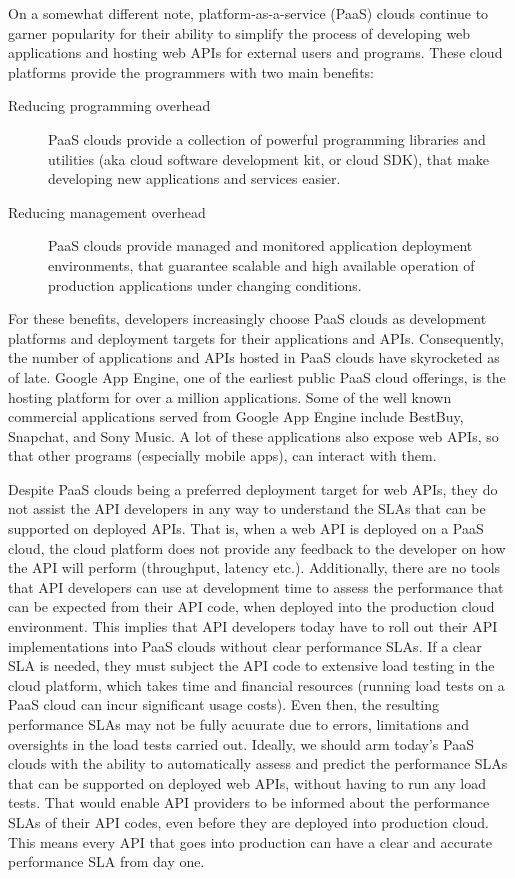 On a somewhat different note, platform-as-a-service (PaaS) clouds continue to garner 
popularity for their ability to simplify the process of developing web applications and
hosting web APIs for external users and programs. These cloud platforms provide the
programmers with two main benefits:

\begin{description}
\item[Reducing programming overhead] PaaS clouds provide a collection of powerful programming 
libraries and utilities (aka cloud software development kit, or cloud SDK), that make developing new applications 
and services easier.
\item[Reducing management overhead] PaaS clouds provide managed and monitored application deployment
environments, that guarantee scalable and high available operation of production applications under
changing conditions.
\end{description}

For these benefits, developers increasingly choose PaaS clouds as development platforms
and deployment targets for their applications and APIs. Consequently, the number of applications and 
APIs hosted in PaaS clouds have skyrocketed as of late. Google App Engine, one of the earliest
public PaaS cloud offerings, is the hosting platform for over a million applications. Some of the
well known commercial applications served from Google App Engine include BestBuy, Snapchat, 
and Sony Music. A lot of these applications also expose web APIs, so that other
programs (especially mobile apps), can interact with them.

Despite PaaS clouds being a preferred deployment target for web APIs, they do not assist the API
developers in any way to understand the SLAs that can be supported on deployed APIs. That is,
when a web API is deployed on a PaaS cloud, the cloud platform does not provide any feedback 
to the developer on how the API will perform (throughput, latency etc.). Additionally,
there are no tools that API developers can use at development time to assess the performance
that can be expected from their API code, when deployed into the production cloud environment.
This implies that API developers today have to roll out their API implementations into PaaS
clouds without clear performance SLAs. If a clear SLA is needed, they must subject the API
code to extensive load testing in the cloud platform, which takes time and financial resources
(running load tests on a PaaS cloud can incur significant usage costs). Even then, the resulting
performance SLAs may not be fully acuurate due to errors, limitations and oversights in the load tests
carried out. Ideally, we should arm today's PaaS clouds with the ability to automatically assess and
predict the performance SLAs that can be supported on deployed web APIs, without having to
run any load tests. That would enable API providers to be informed about the performance
SLAs of their API codes, even before they are deployed into production cloud. This means
every API that goes into production can have a clear and accurate performance SLA from
day one.

